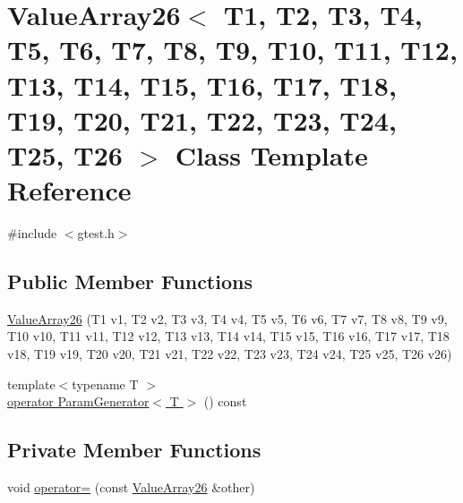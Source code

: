 \hypertarget{classtesting_1_1internal_1_1ValueArray26}{\section{\-Value\-Array26$<$ \-T1, \-T2, \-T3, \-T4, \-T5, \-T6, \-T7, \-T8, \-T9, \-T10, \-T11, \-T12, \-T13, \-T14, \-T15, \-T16, \-T17, \-T18, \-T19, \-T20, \-T21, \-T22, \-T23, \-T24, \-T25, \-T26 $>$ \-Class \-Template \-Reference}
\label{dc/d28/classtesting_1_1internal_1_1ValueArray26}
}


{\ttfamily \#include $<$gtest.\-h$>$}

\subsection*{\-Public \-Member \-Functions}
\begin{DoxyCompactItemize}
\item 
\hyperlink{classtesting_1_1internal_1_1ValueArray26_aa8a0a6a5275e06c3f36fce60fcbc9a91}{\-Value\-Array26} (\-T1 v1, \-T2 v2, \-T3 v3, \-T4 v4, \-T5 v5, \-T6 v6, \-T7 v7, \-T8 v8, \-T9 v9, \-T10 v10, \-T11 v11, \-T12 v12, \-T13 v13, \-T14 v14, \-T15 v15, \-T16 v16, \-T17 v17, \-T18 v18, \-T19 v19, \-T20 v20, \-T21 v21, \-T22 v22, \-T23 v23, \-T24 v24, \-T25 v25, \-T26 v26)
\item 
{\footnotesize template$<$typename T $>$ }\\\hyperlink{classtesting_1_1internal_1_1ValueArray26_a08ef46fa12c9dd8ef6fc630baeea89b7}{operator Param\-Generator$<$ T $>$} () const 
\end{DoxyCompactItemize}
\subsection*{\-Private \-Member \-Functions}
\begin{DoxyCompactItemize}
\item 
void \hyperlink{classtesting_1_1internal_1_1ValueArray26_a2af27ca77b776f2c342f2327613c7fd8}{operator=} (const \hyperlink{classtesting_1_1internal_1_1ValueArray26}{\-Value\-Array26} \&other)
\end{DoxyCompactItemize}
